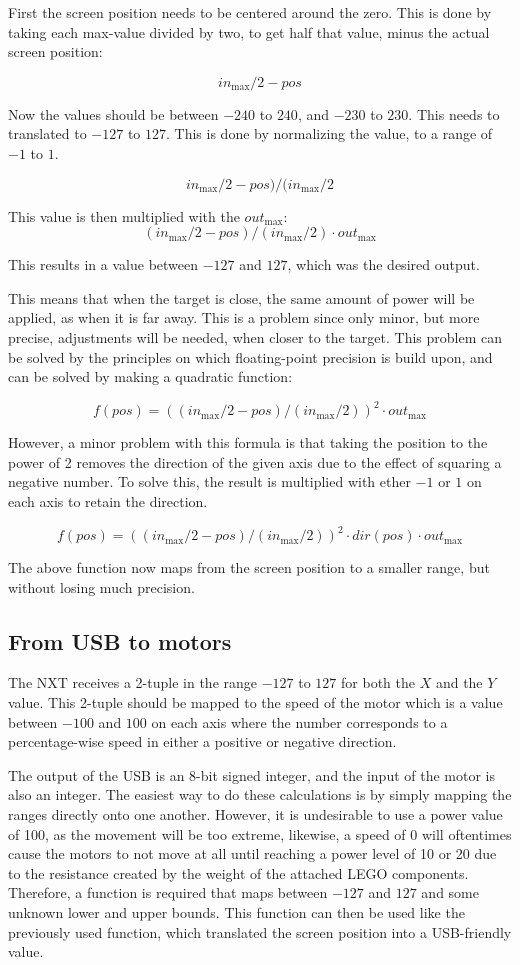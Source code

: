 First the screen position needs to be centered around the zero.
This is done by taking each max-value divided by two, to get half that value, minus the actual screen position:

$$
in_\text{max}/2 - pos
$$

Now the values should be between $-240$ to $240$, and $-230$ to $230$.
This needs to translated to $-127$ to $127$.
This is done by normalizing the value, to a range of $-1$ to $1$.

$$
in_\text{max}/2 - pos)/(in_\text{max}/2
$$


This value is then multiplied with the $out_\text{max}$:
$$
(in_\text{max}/2 - pos)/(in_\text{max}/2) \cdot out_\text{max}
$$

This results in a value between $-127$ and $127$, which was the desired output.


This means that when the target is close, the same amount of power will be applied, as when it is far away.
This is a problem since only minor, but more precise, adjustments will be needed, when closer to the target.
This problem can be solved by the principles on which floating-point precision is build upon, and can be solved by making a quadratic function:

$$
f(pos) = ((in_\text{max}/2 - pos)/(in_\text{max}/2))^2 \cdot out_\text{max}
$$

However, a minor problem with this formula is that taking the position to the power of 2 removes the direction of the given axis due to the effect of squaring a negative number.
To solve this, the result is multiplied with ether $-1$ or $1$ on each axis to retain the direction.

$$
f(pos) = ((in_\text{max}/2 - pos)/(in_\text{max}/2))^2 \cdot dir(pos) \cdot out_\text{max}
$$

The above function now maps from the screen position to a smaller range, but without losing much precision.

\subsection{From USB to motors}
The NXT receives a 2-tuple in the range $-127$ to $127$ for both the $X$ and the $Y$ value.
This 2-tuple should be mapped to the speed of the motor which is a value between $-100$ and $100$ on each axis where the number corresponds to a percentage-wise speed in either a positive or negative direction.

The output of the USB is an 8-bit signed integer, and the input of the motor is also an integer.
The easiest way to do these calculations is by simply mapping the ranges directly onto one another.
However, it is undesirable to use a power value of 100, as the movement will be too extreme, likewise, a speed of 0 will oftentimes cause the motors to not move at all until reaching a power level of 10 or 20 due to the resistance created by the weight of the attached LEGO components.
Therefore, a function is required that maps between $-127$ and $127$ and some unknown lower and upper bounds.
This function can then be used like the previously used function, which translated the screen position into a USB-friendly value.

